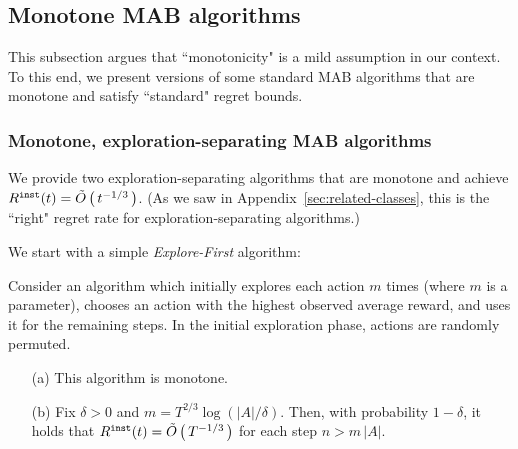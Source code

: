 
\subsection{Monotone MAB algorithms}
\label{app:MAB-monotone}

This subsection argues that ``monotonicity" is a mild assumption in our context. To this end, we present versions of some standard MAB algorithms that are monotone and satisfy ``standard" regret bounds.


\subsubsection{Monotone, exploration-separating MAB algorithms}
\label{app:MAB-monotone-naive}



We provide two exploration-separating algorithms that are monotone and achieve $R^{\mathtt{inst}}(t)=\tilde{O}\left(\,t^{-1/3}\,\right)$. (As we saw in Appendix~\ref{sec:related-classes}, this is the ``right" regret rate for exploration-separating algorithms.)


We start with a simple \emph{Explore-First} algorithm: 

\begin{lemma}
Consider an algorithm which initially explores each action $m$ times (where $m$ is a parameter), chooses an action  with the highest observed average reward, and uses it for the remaining steps. In the initial exploration phase, actions are randomly permuted. 
\begin{itemize}
\item[(a)] This algorithm is monotone.

\item[(b)] Fix $\delta>0$ and 
    $m = T^{2/3}\log(|A|/\delta)$.
Then, with probability $1-\delta$, it holds that  
    $R^{\mathtt{inst}}(t)=\tilde{O}\left(\,T^{-1/3}\,\right)$
for each step $n> m\,|A|$.
\end{itemize}
\end{lemma}

